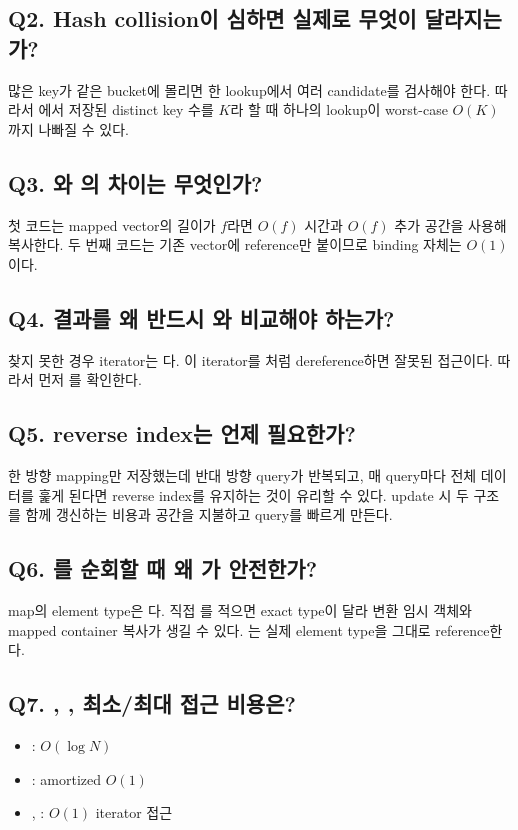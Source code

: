 \subsection{Q2. Hash collision이 심하면 실제로 무엇이 달라지는가?}
많은 key가 같은 bucket에 몰리면 한 lookup에서 여러 candidate를 검사해야 한다. 따라서 에서 저장된 distinct key 수를 $K$라 할 때 하나의 lookup이 worst-case $O(K)$까지 나빠질 수 있다.

\subsection{Q3. 와 의 차이는 무엇인가?}
첫 코드는 mapped vector의 길이가 $f$라면 $O(f)$ 시간과 $O(f)$ 추가 공간을 사용해 복사한다. 두 번째 코드는 기존 vector에 reference만 붙이므로 binding 자체는 $O(1)$이다.

\subsection{Q4.  결과를 왜 반드시 와 비교해야 하는가?}
찾지 못한 경우 iterator는 다. 이 iterator를 처럼 dereference하면 잘못된 접근이다. 따라서 먼저 를 확인한다.

\subsection{Q5. reverse index는 언제 필요한가?}
한 방향 mapping만 저장했는데 반대 방향 query가 반복되고, 매 query마다 전체 데이터를 훑게 된다면 reverse index를 유지하는 것이 유리할 수 있다. update 시 두 구조를 함께 갱신하는 비용과 공간을 지불하고 query를 빠르게 만든다.

\subsection{Q6. 를 순회할 때 왜 가 안전한가?}
map의 element type은 다. 직접 를 적으면 exact type이 달라 변환 임시 객체와 mapped container 복사가 생길 수 있다. 는 실제 element type을 그대로 reference한다.

\subsection{Q7. , , 최소/최대 접근 비용은?}
\begin{itemize}
\item {}: $O(\log N)$
\item {}: amortized $O(1)$
\item {}, : $O(1)$ iterator 접근
\end{itemize}

